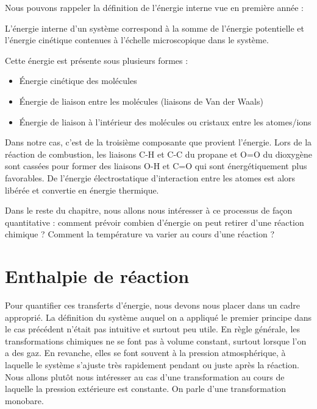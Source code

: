 \documentclass[11pt,fleqn]{book} %
\begin{document}
Nous pouvons rappeler la définition de l'énergie interne vue en première année :
\begin{definition}
 L'énergie interne d'un système correspond à la somme de l'énergie potentielle et l'énergie cinétique contenues à l'échelle microscopique dans le système.
\end{definition}
Cette énergie est présente sous plusieurs formes :
\begin{itemize}
    \item Énergie cinétique des molécules 
    \item Énergie de liaison entre les molécules (liaisons de Van der Waals)
    \item Énergie de liaison à l'intérieur des molécules ou cristaux entre les atomes/ions
\end{itemize}
Dans notre cas, c'est de la troisième composante que provient l'énergie. Lors de la réaction de combustion, les liaisons C-H et C-C du propane et O=O du dioxygène sont cassées pour former des liaisons O-H et C=O qui sont énergétiquement plus favorables. De l'énergie électrostatique d'interaction entre les atomes est alors libérée et convertie en énergie thermique.

Dans le reste du chapitre, nous allons nous intéresser à ce processus de façon quantitative : comment prévoir combien d'énergie on peut retirer d'une réaction chimique ? Comment la température va varier au cours d'une réaction ?

\section{Enthalpie de réaction}

Pour quantifier ces transferts d'énergie, nous devons nous placer dans un cadre approprié. La définition du système auquel on a appliqué le premier principe dans le cas précédent n'était pas intuitive et surtout peu utile. En règle générale, les transformations chimiques ne se font pas à volume constant, surtout lorsque l'on a des gaz. En revanche, elles se font souvent à la pression atmosphérique, à laquelle le système s'ajuste très rapidement pendant ou juste après la réaction. Nous allons plutôt nous intéresser au cas d'une transformation au cours de laquelle la pression extérieure est constante. On parle d'une transformation monobare.
\end{document}
